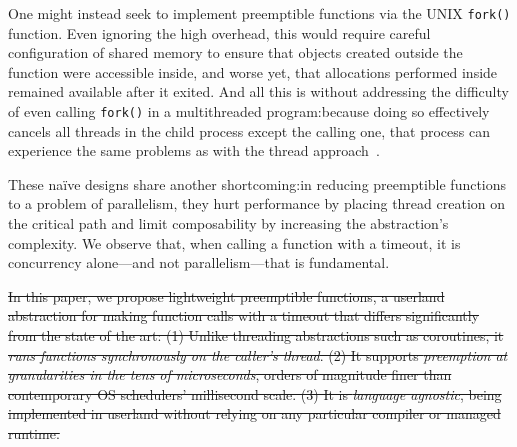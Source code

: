 One might instead seek to implement preemptible functions via the UNIX
\texttt{fork()} function.  Even ignoring the high overhead, this would require
careful configuration of shared memory
to ensure that objects created outside the function were accessible inside, and worse
yet, that allocations performed inside remained available after it exited.
And all this is
without addressing the difficulty of even calling \texttt{fork()} in a multithreaded
program:\@ because doing so effectively cancels all threads in the child process
except the calling one, that process can experience the same problems as with the
thread approach~\cite{baumann:hotos2019}.

These na\"ive designs share another shortcoming:\@ in reducing
preemptible functions to a problem of parallelism, they hurt performance by placing
thread creation on the critical path and limit composability by increasing the
abstraction's complexity.  We observe that, when calling a function with
a timeout, it is concurrency alone---and not parallelism---that is fundamental.

\st{In this paper, we propose lightweight preemptible functions, a userland abstraction
for making function calls with a timeout that differs significantly from the state of
the art:  (1) Unlike threading abstractions such as coroutines, it \textit{runs
functions synchronously on the caller's thread}.  (2) It supports \textit{preemption
at granularities in the tens of microseconds}, orders of magnitude finer than
contemporary OS schedulers' millisecond scale.  (3) It is \textit{language agnostic},
being implemented in userland without relying on any particular compiler or managed
runtime.}


